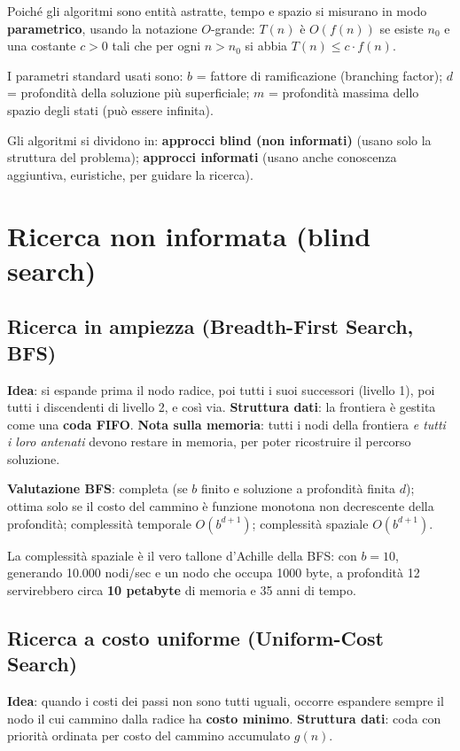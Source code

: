 \documentclass[11pt,a4paper]{report}
\begin{document}
Poiché gli algoritmi sono entità astratte, tempo e spazio si misurano in modo \textbf{parametrico}, usando la notazione $O$-grande: $T(n)$ è $O(f(n))$ se esiste $n_0$ e una costante $c>0$ tali che per ogni $n>n_0$ si abbia $T(n) \le c\cdot f(n)$.

I parametri standard usati sono: $b$ = fattore di ramificazione (branching factor); $d$ = profondità della soluzione più superficiale; $m$ = profondità massima dello spazio degli stati (può essere infinita).

Gli algoritmi si dividono in: \textbf{approcci blind (non informati)} (usano solo la struttura del problema); \textbf{approcci informati} (usano anche conoscenza aggiuntiva, euristiche, per guidare la ricerca).

\section{Ricerca non informata (blind search)}

\subsection{Ricerca in ampiezza (Breadth-First Search, BFS)}

\textbf{Idea}: si espande prima il nodo radice, poi tutti i suoi successori (livello 1), poi tutti i discendenti di livello 2, e così via. \textbf{Struttura dati}: la frontiera è gestita come una \textbf{coda FIFO}. \textbf{Nota sulla memoria}: tutti i nodi della frontiera \emph{e tutti i loro antenati} devono restare in memoria, per poter ricostruire il percorso soluzione.

\textbf{Valutazione BFS}: completa (se $b$ finito e soluzione a profondità finita $d$); ottima solo se il costo del cammino è funzione monotona non decrescente della profondità; complessità temporale $O(b^{d+1})$; complessità spaziale $O(b^{d+1})$.

La complessità spaziale è il vero tallone d'Achille della BFS: con $b=10$, generando 10.000 nodi/sec e un nodo che occupa 1000 byte, a profondità 12 servirebbero circa \textbf{10 petabyte} di memoria e 35 anni di tempo.

\subsection{Ricerca a costo uniforme (Uniform-Cost Search)}

\textbf{Idea}: quando i costi dei passi non sono tutti uguali, occorre espandere sempre il nodo il cui cammino dalla radice ha \textbf{costo minimo}. \textbf{Struttura dati}: coda con priorità ordinata per costo del cammino accumulato $g(n)$.
\end{document}
